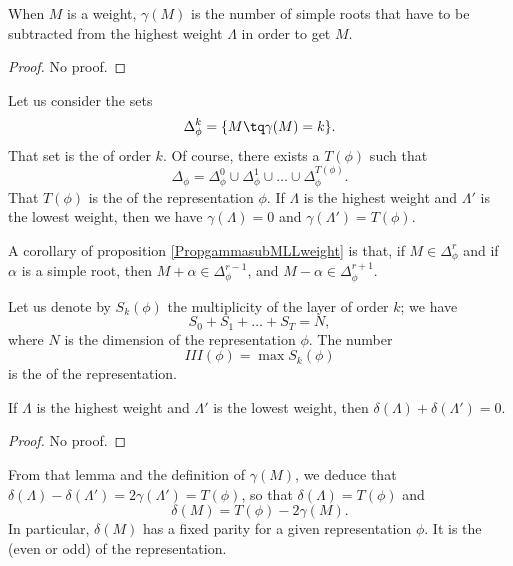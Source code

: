\begin{proposition}     \label{PropgammasubMLLweight}
When $M$ is a weight, $\gamma(M)$ is the number of simple roots that have to be subtracted from the highest weight $\Lambda$ in order to get $M$.
\end{proposition}
\begin{proof}
    No proof.
\end{proof}

Let us consider the sets
\begin{equation}
    \Delta_{\phi}^k=\{ M\tq\gamma(M)=k \}.
\end{equation}
That set is the  of order $k$. Of course, there exists a $T(\phi)$ such that
\begin{equation}
    \Delta_{\phi}=\Delta_{\phi}^0\cup\Delta_{\phi}^1\cup\ldots\cup\Delta_{\phi}^{T(\phi)}.
\end{equation}
That $T(\phi)$ is the  of the representation $\phi$. If $\Lambda$ is the highest weight and $\Lambda'$ is the lowest weight, then we have $\gamma(\Lambda)=0$ and $\gamma(\Lambda')=T(\phi)$.

A corollary of proposition \ref{PropgammasubMLLweight} is that, if $M\in\Delta_{\phi}^r$ and if $\alpha$ is a simple root, then $M+\alpha\in\Delta_{\phi}^{r-1}$, and $M-\alpha\in\Delta_{\phi}^{r+1}$. 

Let us denote by $S_k(\phi)$ the multiplicity of the layer of order $k$; we have
\begin{equation}
    S_0+S_1+\ldots+S_T=N,
\end{equation}
where $N$ is the dimension of the representation $\phi$. The number 
\begin{equation}
    III(\phi)=\max S_k(\phi)
\end{equation}
is the  of the representation.

\begin{lemma}   
    If $\Lambda$ is the highest weight and $\Lambda'$ is the lowest weight, then $\delta(\Lambda)+\delta(\Lambda')=0$.
\end{lemma}
\begin{proof}
    No proof.
\end{proof}
From that lemma and the definition of $\gamma(M)$, we deduce that $\delta(\Lambda)-\delta(\Lambda')=2\gamma(\Lambda')=T(\phi)$, so that $\delta(\Lambda)=T(\phi)$ and
\begin{equation}
     \delta(M)=T(\phi)-2\gamma(M).
\end{equation}
In particular, $\delta(M)$ has a fixed parity for a given representation $\phi$. It is the  (even or odd) of the representation.

